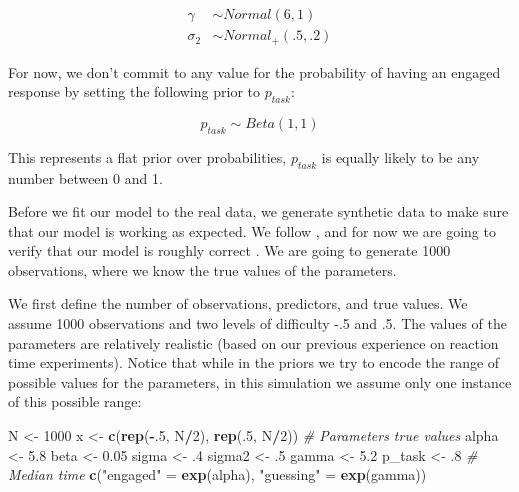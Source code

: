 \documentclass[12pt,]{krantz}
\newenvironment{Shaded}{\begin{snugshade}}{\end{snugshade}}
\newcommand{\CommentTok}[1]{\textcolor[rgb]{0.56,0.35,0.01}{\textit{#1}}}
\newcommand{\DecValTok}[1]{\textcolor[rgb]{0.00,0.00,0.81}{#1}}
\newcommand{\FloatTok}[1]{\textcolor[rgb]{0.00,0.00,0.81}{#1}}
\newcommand{\KeywordTok}[1]{\textcolor[rgb]{0.13,0.29,0.53}{\textbf{#1}}}
\newcommand{\NormalTok}[1]{#1}
\newcommand{\OperatorTok}[1]{\textcolor[rgb]{0.81,0.36,0.00}{\textbf{#1}}}
\newcommand{\StringTok}[1]{\textcolor[rgb]{0.31,0.60,0.02}{#1}}
\theoremstyle{definition}
\theoremstyle{definition}
\theoremstyle{definition}
\theoremstyle{remark}
\begin{document}
\begin{equation}
\begin{aligned}
\gamma &\sim Normal(6, 1)\\
\sigma_2 &\sim Normal_+(.5, .2)
\end{aligned}
\end{equation}

For now, we don't commit to any value for the probability of having an engaged response by setting the following prior to \(p_{task}\):

\begin{equation}
p_{task} \sim Beta(1, 1)
\end{equation}

This represents a flat prior over probabilities, \(p_{task}\) is equally likely to be any number between 0 and 1.

Before we fit our model to the real data, we generate synthetic data to make sure that our model is working as expected. We follow \citet{Cooketal2006}, and for now we are going to verify that our model is roughly correct \citetext{\citealp[a more thorough approach is presented in][]{talts2018validating}; \citealp[and][]{schad2020toward}}. We are going to generate 1000 observations, where we know the true values of the parameters.

We first define the number of observations, predictors, and true values. We assume 1000 observations and two levels of difficulty -.5 and .5. The values of the parameters are relatively realistic (based on our previous experience on reaction time experiments). Notice that while in the priors we try to encode the range of possible values for the parameters, in this simulation we assume only one instance of this possible range:

\begin{Shaded}
\begin{Highlighting}[]
\NormalTok{N <-}\StringTok{ }\DecValTok{1000}
\NormalTok{x <-}\StringTok{ }\KeywordTok{c}\NormalTok{(}\KeywordTok{rep}\NormalTok{(}\OperatorTok{-}\NormalTok{.}\DecValTok{5}\NormalTok{, N}\OperatorTok{/}\DecValTok{2}\NormalTok{), }\KeywordTok{rep}\NormalTok{(.}\DecValTok{5}\NormalTok{, N}\OperatorTok{/}\DecValTok{2}\NormalTok{))}
\CommentTok{# Parameters true values}
\NormalTok{alpha <-}\StringTok{ }\FloatTok{5.8}
\NormalTok{beta <-}\StringTok{ }\FloatTok{0.05}
\NormalTok{sigma <-}\StringTok{ }\FloatTok{.4}
\NormalTok{sigma2 <-}\StringTok{ }\FloatTok{.5}
\NormalTok{gamma <-}\StringTok{ }\FloatTok{5.2}
\NormalTok{p_task <-}\StringTok{ }\FloatTok{.8}
\CommentTok{# Median time}
\KeywordTok{c}\NormalTok{(}\StringTok{"engaged"}\NormalTok{ =}\StringTok{ }\KeywordTok{exp}\NormalTok{(alpha), }\StringTok{"guessing"}\NormalTok{ =}\StringTok{ }\KeywordTok{exp}\NormalTok{(gamma))}
\end{Highlighting}
\end{Shaded}
\end{document}
